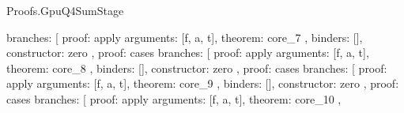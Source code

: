 \begin{lexlean}{Proofs.GpuQ4SumStage}
\begin{semanticmodule}
{{{{{{{{{{{{{{{{                                              branches: [
                                                {
                                                  proof: apply{
                                                    arguments: [f, a, t],
                                                    theorem: core_7
                                                  },
                                                  binders: [],
                                                  constructor: zero
                                                },
                                                {
                                                  proof: cases{
                                                    branches: [
                                                      {
                                                        proof: apply{
                                                          arguments: [f, a, t],
                                                          theorem: core_8
                                                        },
                                                        binders: [],
                                                        constructor: zero
                                                      },
                                                      {
                                                        proof: cases{
                                                          branches: [
                                                            {
                                                              proof: apply{
                                                                arguments: [f, a, t],
                                                                theorem: core_9
                                                              },
                                                              binders: [],
                                                              constructor: zero
                                                            },
                                                            {
                                                              proof: cases{
                                                                branches: [
                                                                  {
                                                                    proof: apply{
                                                                      arguments: [f, a, t],
                                                                      theorem: core_10
                                                                    },
}}}}}}}}}}}}}}}}}}}}}}}
\end{semanticmodule}
\end{lexlean}
